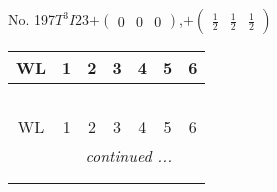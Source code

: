 \documentclass[fleqn,9pt,landscape]{jsarticle}
\begin{document}
\newpage
No. 197\quad$T_{}^{3}$\quad$I23$\quad[ cubic ]\quad$+\begin{pmatrix} 0 & 0 & 0 \end{pmatrix}$,\quad $+\begin{pmatrix} \frac{1}{2} & \frac{1}{2} & \frac{1}{2} \end{pmatrix}$
\begin{center}
\renewcommand{\arraystretch}{1.2}
\begin{longtable}{ccccccc}
 \hline \hline
WL & 1 & 2 & 3 & 4 & 5 & 6 \\ \hline \endfirsthead

\multicolumn{6}{l}{\tablename\ \thetable{}} \\
 \hline \hline
WL & 1 & 2 & 3 & 4 & 5 & 6 \\ \hline \endhead

 \hline \hline
\multicolumn{6}{r}{\footnotesize\it continued ...} \\ \endfoot

 \hline \hline
\multicolumn{6}{r}{} \\ \endlastfoot


\end{longtable}
\end{center}
\end{document}
